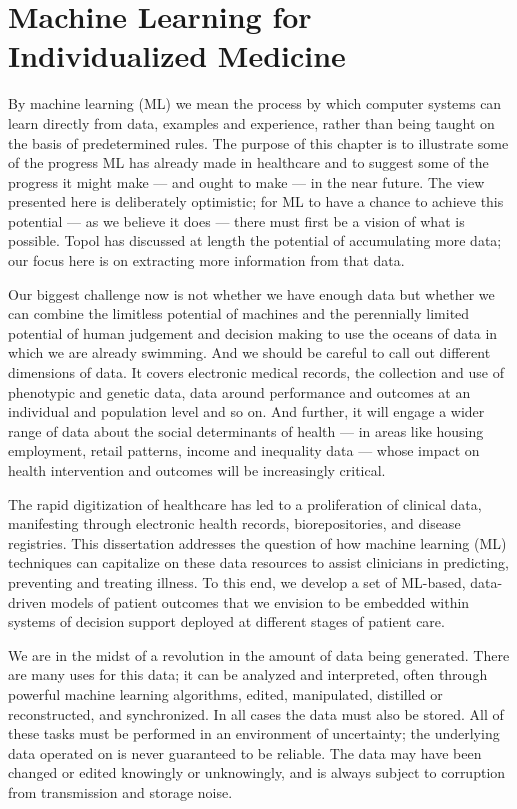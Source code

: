 \documentclass [PhD] {uclathes}
\begin{document}
\section{Machine Learning for Individualized Medicine}

By machine learning (ML) we mean the process by which computer systems can learn directly from data, examples and experience, rather than being taught on the basis of predetermined rules. The purpose of this chapter is to illustrate some of the progress ML has already made in healthcare and to suggest some of the progress it might make --- and ought to make --- in the near future. The view presented here is deliberately optimistic; for ML to have a chance to achieve this potential --- as we believe it does --- there must first be a vision of what is possible. Topol has discussed at length the potential of accumulating more data; our focus here is on extracting more information from that data.

Our biggest challenge now is not whether we have enough data but whether we can combine the limitless potential of machines and the perennially limited potential of human judgement and decision making to use the oceans of data in which we are already swimming. And we should be careful to call out different dimensions of data. It covers electronic medical records, the collection and use of phenotypic and genetic data, data around performance and outcomes at an individual and population level and so on. And further, it will engage a wider range of data about the social determinants of health --- in areas like housing employment, retail patterns, income and inequality data --- whose impact on health intervention and outcomes will be increasingly critical. 

The rapid digitization of healthcare has led to a proliferation of clinical data, manifesting through electronic health records, biorepositories, and disease registries. This dissertation addresses the question of how machine learning (ML) techniques can capitalize on these data resources to assist clinicians in predicting, preventing and treating illness. To this end, we develop a set of ML-based, data-driven models of patient outcomes that we envision to be embedded within systems of decision support deployed at different stages of patient care.

We are in the midst of a revolution in the amount of data being generated. There are
many uses for this data; it can be analyzed and interpreted, often through powerful machine learning algorithms, edited, manipulated, distilled or reconstructed, and synchronized. In all cases the data must also be stored. All of these tasks must be performed in an environment of uncertainty; the underlying data operated on is never guaranteed to be reliable. The data may have been changed or edited knowingly or unknowingly, and is always subject to corruption from transmission and storage noise.
\end{document}
